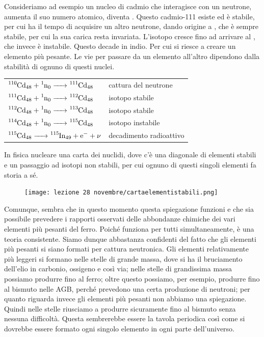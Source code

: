 Consideriamo ad esempio un nucleo di cadmio che interagisce con un neutrone, aumenta il suo numero atomico, diventa . Questo cadmio-111 esiste ed è stabile, per cui ha il tempo di acquisire un altro neutrone, dando origine a , che è sempre stabile, per cui la sua carica resta invariata. L'isotopo cresce fino ad arrivare al , che invece è instabile. Questo decade in indio. Per cui si riesce a creare un elemento più pesante. Le vie per passare da un elemento all'altro dipendono dalla stabilità di ognuno di questi nuclei.

\begin{center}
    \begin{tabular}{ll}
        $\ce{^{110}Cd_{48} + ^1n_0 -> ^{111}Cd_{48}}$ & cattura del neutrone\\
        $\ce{^{111}Cd_{48} + ^1n_0 -> ^{112}Cd_{48}}$ & isotopo stabile\\
        $\ce{^{112}Cd_{48} + ^1n_0 -> ^{113}Cd_{48}}$ & isotopo stabile\\
        $\ce{^{114}Cd_{48} + ^1n_0 -> ^{115}Cd_{48}}$ & isotopo instabile\\
        $\ce{^{115}Cd_{48} -> ^{115}In_{49} + e^- + \nu}$ & decadimento radioattivo
    \end{tabular}
\end{center}

In fisica nucleare una carta dei nuclidi, dove c'è una diagonale di elementi stabili e un passaggio ad isotopi non stabili, per cui ognuno di questi singoli elementi fa storia a sé.

\begin{figure}[H]
    \centering
    \texttt{[image: lezione 28 novembre/cartaelementistabili.png]}
    \label{lezione 28 novembre/cartaelementistabili.png}
\end{figure}

Comunque, sembra che in questo momento questa spiegazione funzioni e che sia possibile prevedere i rapporti osservati delle abbondanze chimiche dei vari elementi più pesanti del ferro. Poiché funziona per tutti simultaneamente, è una teoria consistente. Siamo dunque abbastanza confidenti del fatto che gli elementi più pesanti si siano formati per cattura neutronica. Gli elementi relativamente più leggeri si formano nelle stelle di grande massa, dove si ha il bruciamento dell'elio in carbonio, ossigeno e così via; nelle stelle di grandissima massa possiamo produrre fino al ferro; oltre questo possiamo, per esempio, produrre fino al bismuto nelle AGB, perché prevedono una certa produzione di neutroni; per quanto riguarda invece gli elementi più pesanti non abbiamo una spiegazione. Quindi nelle stelle riusciamo a produrre sicuramente fino al bismuto senza nessuna difficoltà. Questa sembrerebbe essere la tavola periodica così come si dovrebbe essere formato ogni singolo elemento in ogni parte dell'universo.

